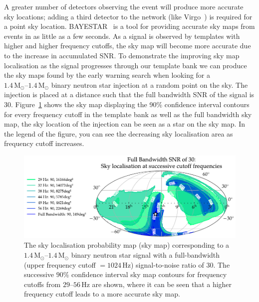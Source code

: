 A greater number of detectors observing the event will produce more accurate sky locations; adding a third detector to the network (like Virgo~\cite{aVirgo:2015}) is required for a point sky location. BAYESTAR~\cite{BAYESTAR:2016} is a tool for providing accurate sky maps from \gwadj events in as little as a few seconds. As a \gwadj signal is observed by templates with higher and higher frequency cutoffs, the sky map will become more accurate due to the increase in accumulated SNR. To demonstrate the improving sky map localisation as the signal progresses through our template bank we can produce the sky maps found by the early warning search when looking for a $1.4 \, \text{M$_\odot$}\text{--}1.4 \, \text{M$_\odot$}$ binary neutron star injection at a random point on the sky. The \gwadj injection is placed at a distance such that the full bandwidth SNR of the signal is $30$. Figure~\ref{6:fig:ew_30SNR_multiple} shows the sky map displaying the 90\% confidence interval contours for every frequency cutoff in the template bank as well as the full bandwidth sky map, the sky location of the injection can be seen as a star on the sky map. In the legend of the figure, you can see the decreasing sky localisation area as frequency cutoff increases.
%
\begin{figure}
    \centering
    \includegraphics[width=\textwidth]{images/6_earlywarning/localisation/30SNR_multiple.pdf}
    \caption{The \gwadj sky localisation probability map (sky map) corresponding to a $1.4 \, \text{M$_\odot$}\text{--}1.4 \, \text{M$_\odot$}$ binary neutron star signal with a full-bandwidth (upper frequency cutoff $= 1024 \, \text{Hz}$) signal-to-noise ratio of $30$. The successive $90\%$ confidence interval sky map contours for frequency cutoffs from $29\text{--}56 \, \text{Hz}$ are shown, where it can be seen that a higher frequency cutoff leads to a more accurate sky map.}
    \label{6:fig:ew_30SNR_multiple}
\end{figure}
%

